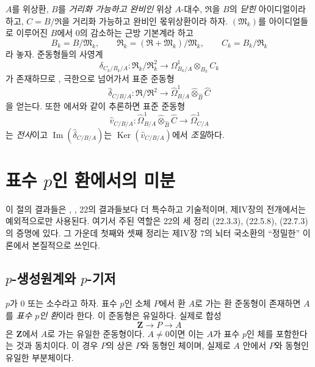 \begin{env}[20.7.20]
\label{0.20.7.20-ko}
$A$를 위상환, $B$를 \emph{거리화 가능하고 완비인} 위상
$A$-대수, $\mathfrak R$을 $B$의 \emph{닫힌} 아이디얼이라 하고,
$C=B/\mathfrak R$을 거리화 가능하고 완비인 몫위상환이라 하자.
$(\mathfrak M_k)$를 아이디얼들로 이루어진 $B$에서 $0$의 감소하는
근방 기본계라 하고
\[
  B_k=B/\mathfrak M_k,\qquad
  \mathfrak R_k=(\mathfrak R+\mathfrak M_k)/\mathfrak M_k,\qquad
  C_k=B_k/\mathfrak R_k
\]
라 놓자. 준동형들의 사영계
\[
  \delta_{C_k/B_k/A}:
  \mathfrak R_k/\mathfrak R_k^2\longrightarrow
  \Omega^1_{B_k/A}\otimes_{B_k}C_k
\]
가 존재하므로 , 극한으로 넘어가서 표준 준동형
\[
  \widehat\delta_{C/B/A}:
  \mathfrak R/\mathfrak R^2\longrightarrow
  \widehat{\Omega}^1_{B/A}
  \widehat\otimes_{\widehat B}\widehat C
\]
을 얻는다. 또한 에서와 같이 추론하면 표준 준동형
\[
  \widehat v_{C/B/A}:
  \widehat{\Omega}^1_{B/A}
  \widehat\otimes_{\widehat B}\widehat C
  \longrightarrow\widehat{\Omega}^1_{C/A}
\]
는 \emph{전사}이고
$\operatorname{Im}(\widehat\delta_{C/B/A})$는
$\operatorname{Ker}(\widehat v_{C/B/A})$에서 \emph{조밀}하다.
\end{env}
\section{표수 $p$인 환에서의 미분}
\label{section:0.21-ko}
\label{0.21-ko}

이 절의 결과들은 , , \textsection22의 결과들보다
더 특수하고 기술적이며, 제IV장의 전개에서는 예외적으로만 사용된다.
여기서 주된 역할은 \textsection22의 세 정리 (22.3.3), (22.5.8),
(22.7.3)의 증명에 있다. 그 가운데 첫째와 셋째 정리는 제IV장
\textsection7의 뇌터 국소환의 ``정밀한'' 이론에서 본질적으로 쓰인다.

\subsection{$p$-생성원계와 $p$-기저}
\label{subsection:0.21.1-ko}
\label{0.21.1-ko}

\begin{env}[21.1.1]
\label{0.21.1.1-ko}
$p$가 $0$ 또는 소수라고 하자. 표수 $p$인 소체 $P$에서 환 $A$로 가는
환 준동형이 존재하면 $A$를 \emph{표수 $p$인 환}이라 한다. 이 준동형은
유일하다. 실제로 합성
\[
  \mathbf Z\longrightarrow P\longrightarrow A
\]
은 $\mathbf Z$에서 $A$로 가는 유일한 준동형이다. $A\neq0$이면 이는
$A$가 표수 $p$인 체를 포함한다는 것과 동치이다. 이 경우 $P$의 상은
$P$와 동형인 체이며, 실제로 $A$ 안에서 $P$와 동형인 유일한 부분체이다.
\end{env}

